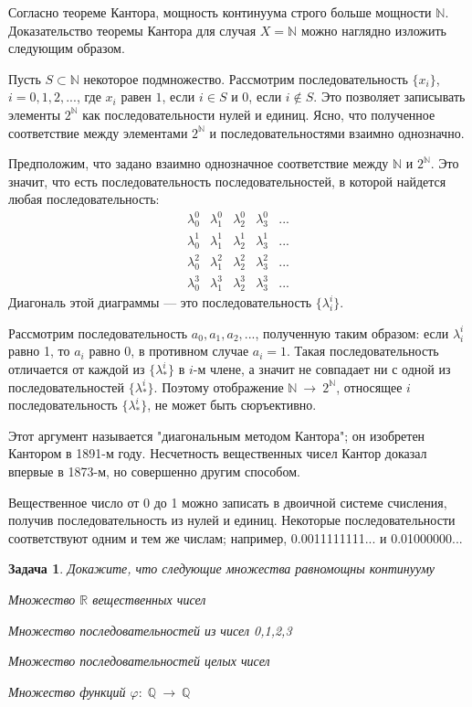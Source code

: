 \documentclass[12pt]{book}
\newcommand{\arrow}{{\:\longrightarrow\:}}
\renewcommand{\phi}{\varphi}
\def\R{{\mathbb R}}
\def\Q{{\mathbb Q}}
\def\N{{\mathbb N}}
\theoremstyle{upshape}
\newtheorem{zadacha}{Задача}[chapter]
\theoremstyle{generic}
\newtheorem{remark}[teorema]{Замечание}
\def\замечание{\begin{remark}}
\def\еза{\end{remark}}
\theoremstyle{upshapenonumber}
\newcommand{\следствие}{%
     \refstepcounter{teorema}
     {\noindent\bf Следствие \thechapter.\arabic{teorema}:\ }}
\newcommand{\пример}{%
     \refstepcounter{teorema}
     {\noindent\bf Пример \thechapter.\arabic{teorema}:\ }}
\newcommand{\лемма}{%
     \refstepcounter{teorema}
     {\noindent\bf Лемма \thechapter.\arabic{teorema}:\ }}
\newcommand{\теорема}{%
     \refstepcounter{teorema}
     {\noindent\bf Теорема \thechapter.\arabic{teorema}:\ }}
\newcommand{\утверждение}{%
     \refstepcounter{teorema}
     {\noindent\bf Утверждение \thechapter.\arabic{teorema}:\ }}
\def\ем{\em}
\def\ит{\it}
\def\задача{\begin{zadacha}}
\def\ез{\end{zadacha}}
\def\еу{\end{ukazanie}}
\def\ео{\end{opredelenie}}
\def\енум{\begin{enumerate}}
\def\ее{\end{enumerate}}
\def\итем{\item %
}
\begin{document}
Согласно теореме Кантора, мощность
континуума строго больше мощности $\N$.
Доказательство теоремы Кантора для
случая $X=\N$ можно наглядно изложить
следующим образом. 

Пусть $S\subset \N$ некоторое подмножество.
Рассмотрим последовательность $\{x_i\}$, $i=0,1,2, ...$,
где $x_i$ равен $1$, если $i\in S$ и 0, если
$i\notin S$. Это позволяет записывать
элементы $2^\N$ как последовательности
нулей и единиц. Ясно, что полученное
соответствие между элементами $2^\N$
и последовательностями взаимно однозначно.

Предположим, что задано взаимно однозначное
соответствие между $\N$ и $2^\N$. Это значит,
что есть последовательность последовательностей,
в которой найдется любая последовательность:
\[
\begin{array}{ccccc}
\lambda^0_0 & \lambda_1^0 & \lambda_2^0 & \lambda_3^0 & ...\\
\lambda^1_0 &\lambda_1^1 & \lambda_2^1 & \lambda_3^1 & ...\\
\lambda^2_0 &\lambda_1^2 & \lambda_2^2 & \lambda_3^2 & ...\\
\lambda^3_0 &\lambda_1^3 & \lambda_2^3 & \lambda_3^3 & ...
\end{array}
\]
Диагональ этой диаграммы --- 
это последовательность $\{\lambda^i_i\}$.

Рассмотрим последовательность $a_0, a_1, a_2, ...$,
полученную таким образом: если $\lambda^i_i$ равно 1,
то $a_i$ равно 0, в противном случае $a_i=1$.
Такая последовательность отличается
от каждой из $\{\lambda^i_*\}$ в $i$-м члене, 
а значит не совпадает ни с одной из последовательностей
$\{\lambda^i_*\}$. Поэтому отображение
$\N \arrow 2^\N$, относящее $i$ 
последовательность $\{\lambda^i_*\}$,
не может быть сюръективно.

Этот аргумент 
называется "диагональным методом Кантора";
он изобретен Кантором в 1891-м году. Несчетность
вещественных чисел Кантор доказал впервые 
в 1873-м, но совершенно другим способом.

Вещественное число от 0 до 1 можно
записать в двоичной системе счисления,
получив последовательность из нулей и единиц.
Некоторые последовательности соответствуют 
одним и тем же числам; например,
0.0011111111... и 0.01000000...

\задача
Докажите, что следующие множества равномощны континууму
\итем Множество $\R$ вещественных чисел
\итем Множество последовательностей из чисел 0,1,2,3
\итем Множество последовательностей целых чисел
\итем Множество функций $\phi:\; \Q \arrow \Q$
\ез
\end{document}
